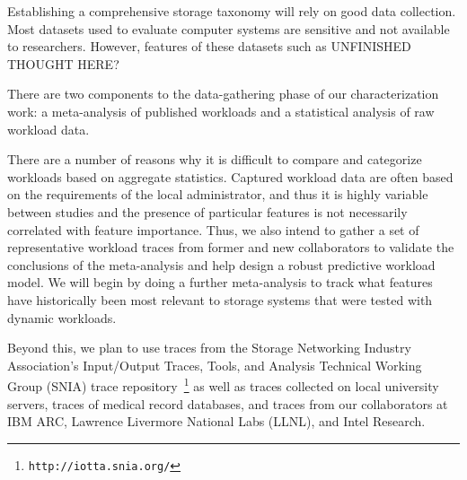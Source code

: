 Establishing a comprehensive storage taxonomy will rely on good data
collection.  Most datasets used to evaluate computer systems are sensitive and
not available to researchers.  However, features of these datasets such as UNFINISHED THOUGHT HERE?


There are two components to the data-gathering phase of our characterization
work: a meta-analysis of published workloads and a statistical analysis of raw
workload data. 

There are a number of reasons why it is difficult to compare and categorize
workloads based on aggregate statistics.  Captured workload data are often based
on the requirements of the local administrator, and thus it is highly variable
between studies and the presence of particular features is not necessarily
correlated with feature importance.  Thus, we also intend to gather a set of
representative workload traces from former and new collaborators to validate the
conclusions of the meta-analysis and help design a robust predictive workload
model.
We will begin by doing a further meta-analysis to track what features have
historically been most relevant to storage systems that were tested with dynamic
workloads.

Beyond this, we plan to use traces from the Storage Networking
Industry Association's Input/Output
Traces, Tools, and Analysis Technical Working Group (SNIA) trace
repository~\footnote{\texttt{http://iotta.snia.org/}} as well as traces
collected on local university servers, traces of medical record databases, and
traces from our collaborators at IBM ARC, Lawrence Livermore National Labs
(LLNL), and Intel Research.






